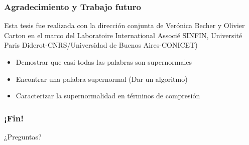 \documentclass[10pt,mathserif]{beamer}%
\begin{document}

\begin{frame}
  \frametitle{Agradecimiento y Trabajo futuro}
  Esta tesis fue realizada con la dirección conjunta de Ver\'onica Becher y Olivier Carton en el marco del Laboratoire International Associé SINFIN, Université Paris Diderot-CNRS/Universidad de Buenos Aires-CONICET)\\
  \bigskip
  \begin{itemize}
    \item Demostrar que casi todas las palabras son supernormales
    \item Encontrar una palabra supernormal (Dar un algoritmo)
    \item Caracterizar la supernormalidad en términos de compresión
  \end{itemize}
\end{frame}

\begin{frame}
  \frametitle{¡Fin!}
  \begin{center}
  {\Huge ¿Preguntas?}
  \end{center}
\end{frame}
  
\end{document}

